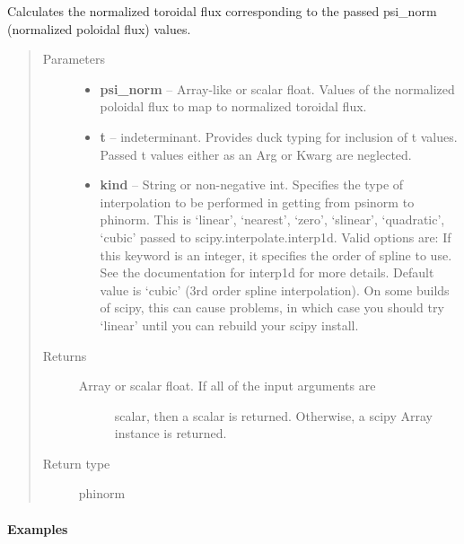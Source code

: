 \documentclass[letterpaper,10pt,english]{sphinxmanual}
\begin{document}
\begin{fulllineitems}
\begin{fulllineitems}
\label{eqtools:eqtools.eqdskreader.EqdskReader.psinorm2phinorm}
Calculates the normalized toroidal flux corresponding to the passed psi\_norm (normalized poloidal flux) values.
\begin{quote}\begin{description}
\item[{Parameters}] \leavevmode\begin{itemize}
\item {} 
\textbf{psi\_norm} -- Array-like or scalar float.
Values of the normalized
poloidal flux to map to normalized toroidal flux.

\item {} 
\textbf{t} -- indeterminant.
Provides duck typing for inclusion of t values. Passed t values
either as an Arg or Kwarg are neglected.

\item {} 
\textbf{kind} -- String or non-negative int.
Specifies the type of interpolation
to be performed in getting from psinorm to phinorm. This is
`linear', `nearest', `zero', `slinear', `quadratic', `cubic'
passed to scipy.interpolate.interp1d. Valid options are:
If this keyword is an integer, it specifies the order of spline
to use. See the documentation for interp1d for more details.
Default value is `cubic' (3rd order spline interpolation). On
some builds of scipy, this can cause problems, in which case
you should try `linear' until you can rebuild your scipy install.

\end{itemize}

\item[{Returns}] \leavevmode
\begin{description}
\item[{Array or scalar float. If all of the input arguments are}] \leavevmode
scalar, then a scalar is returned. Otherwise, a scipy Array
instance is returned.

\end{description}


\item[{Return type}] \leavevmode
phinorm

\end{description}\end{quote}
\paragraph{Examples}


\end{fulllineitems}
\end{fulllineitems}
\end{document}
